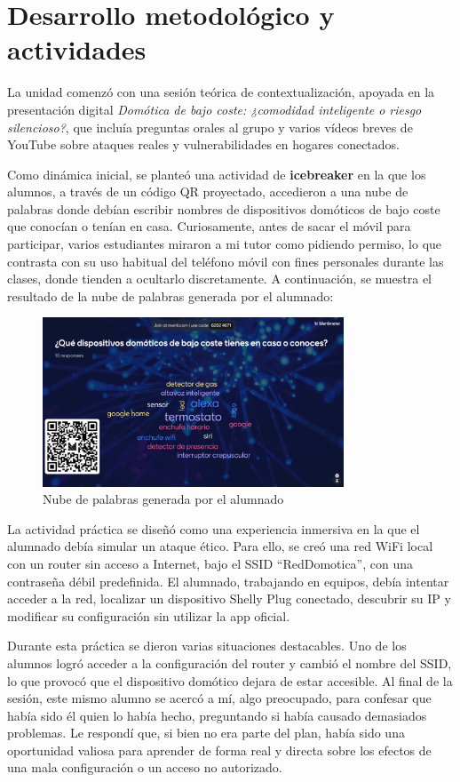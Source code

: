 \section*{Desarrollo metodológico y actividades}

La unidad comenzó con una sesión teórica de contextualización, apoyada en la presentación digital \textit{Domótica de bajo coste: ¿comodidad inteligente o riesgo silencioso?}, que incluía preguntas orales al grupo y varios vídeos breves de YouTube sobre ataques reales y vulnerabilidades en hogares conectados.

Como dinámica inicial, se planteó una actividad de \textbf{icebreaker} en la que los alumnos, a través de un código QR proyectado, accedieron a una nube de palabras donde debían escribir nombres de dispositivos domóticos de bajo coste que conocían o tenían en casa. Curiosamente, antes de sacar el móvil para participar, varios estudiantes miraron a mi tutor como pidiendo permiso, lo que contrasta con su uso habitual del teléfono móvil con fines personales durante las clases, donde tienden a ocultarlo discretamente. A continuación, se muestra el resultado de la nube de palabras generada por el alumnado:
\begin{figure}[H]
  \centering
  \includegraphics[width=0.8\textwidth]{resources/nube.jpg}
  \caption{Nube de palabras generada por el alumnado}
  \label{fig:nube_palabras}
\end{figure}

La actividad práctica se diseñó como una experiencia inmersiva en la que el alumnado debía simular un ataque ético. Para ello, se creó una red WiFi local con un router sin acceso a Internet, bajo el SSID “RedDomotica”, con una contraseña débil predefinida. El alumnado, trabajando en equipos, debía intentar acceder a la red, localizar un dispositivo Shelly Plug conectado, descubrir su IP y modificar su configuración sin utilizar la app oficial. 

Durante esta práctica se dieron varias situaciones destacables. Uno de los alumnos logró acceder a la configuración del router y cambió el nombre del SSID, lo que provocó que el dispositivo domótico dejara de estar accesible. Al final de la sesión, este mismo alumno se acercó a mí, algo preocupado, para confesar que había sido él quien lo había hecho, preguntando si había causado demasiados problemas. Le respondí que, si bien no era parte del plan, había sido una oportunidad valiosa para aprender de forma real y directa sobre los efectos de una mala configuración o un acceso no autorizado. 

